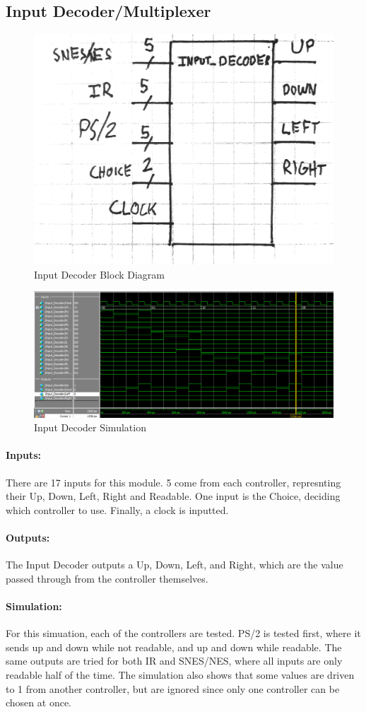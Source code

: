 \documentclass[]{article}
\begin{document}
\subsection{Input Decoder/Multiplexer}
\begin{figure}[H]\centering
    \includegraphics[width=0.5\linewidth]{figures/Input_Decoder_Block.jpg}
    \caption{Input Decoder Block Diagram}
    \label{fig:inputDecoderBlock}
\end{figure}
\begin{figure}[H]\centering
    \includegraphics[width=\linewidth]{figures/Input_Decoder_Sim.png}
    \caption{Input Decoder Simulation}
    \label{fig:inputDecoderSim}
\end{figure}
\paragraph{Inputs:} There are 17 inputs for this module. 5 come from each controller, represnting their Up, Down, Left, Right and Readable. One input is the Choice, deciding which controller to use. Finally, a clock is inputted.
\paragraph{Outputs:} The Input Decoder outputs a Up, Down, Left, and Right, which are the value passed through from the controller themselves.
\paragraph{Simulation:} For this simuation, each of the controllers are tested. PS/2 is tested first, where it sends up and down while not readable, and up and down while readable. The same outputs are tried for both IR and SNES/NES, where all inputs are only readable half of the time. The simulation also shows that some values are driven to 1 from another controller, but are ignored since only one controller can be chosen at once.
\end{document}

